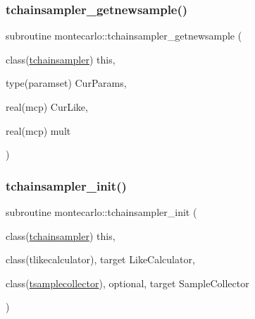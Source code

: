 \subsubsection{\texorpdfstring{tchainsampler\+\_\+getnewsample()}{tchainsampler\_getnewsample()}}
{\footnotesize\ttfamily subroutine montecarlo\+::tchainsampler\+\_\+getnewsample (\begin{DoxyParamCaption}\item[{class(\mbox{\hyperlink{structmontecarlo_1_1tchainsampler}{tchainsampler}})}]{this,  }\item[{type(paramset)}]{Cur\+Params,  }\item[{real(mcp)}]{Cur\+Like,  }\item[{real(mcp)}]{mult }\end{DoxyParamCaption})\hspace{0.3cm}{\ttfamily [private]}}

\mbox{\label{namespacemontecarlo_a0eb56d8656442c96e8f066453a7b5209}} 
\subsubsection{\texorpdfstring{tchainsampler\+\_\+init()}{tchainsampler\_init()}}
{\footnotesize\ttfamily subroutine montecarlo\+::tchainsampler\+\_\+init (\begin{DoxyParamCaption}\item[{class(\mbox{\hyperlink{structmontecarlo_1_1tchainsampler}{tchainsampler}})}]{this,  }\item[{class(tlikecalculator), target}]{Like\+Calculator,  }\item[{class(\mbox{\hyperlink{structmontecarlo_1_1tsamplecollector}{tsamplecollector}}), optional, target}]{Sample\+Collector }\end{DoxyParamCaption})\hspace{0.3cm}{\ttfamily [private]}}

\mbox{\label{namespacemontecarlo_ae01ead2e419d0e7cb8126beb7b6a1278}} 
